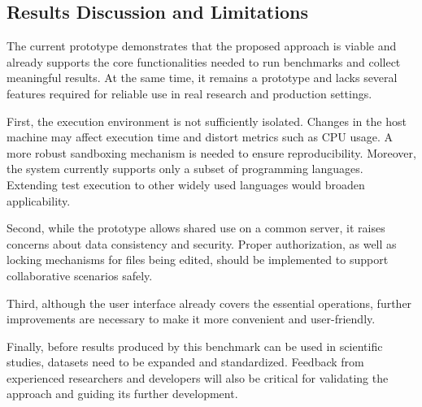 

\subsection{Results Discussion and Limitations}

The current prototype demonstrates that the proposed approach is viable and already supports the core functionalities needed to run benchmarks and collect meaningful results.
At the same time, it remains a prototype and lacks several features required for reliable use in real research and production settings.

First, the execution environment is not sufficiently isolated.
Changes in the host machine may affect execution time and distort metrics such as CPU usage.
A more robust sandboxing mechanism is needed to ensure reproducibility.
Moreover, the system currently supports only a subset of programming languages.
Extending test execution to other widely used languages would broaden applicability.

Second, while the prototype allows shared use on a common server, it raises concerns about data consistency and security.
Proper authorization, as well as locking mechanisms for files being edited, should be implemented to support collaborative scenarios safely.

Third, although the user interface already covers the essential operations, further improvements are necessary to make it more convenient and user-friendly.

Finally, before results produced by this benchmark can be used in scientific studies, datasets need to be expanded and standardized.
Feedback from experienced researchers and developers will also be critical for validating the approach and guiding its further development.



